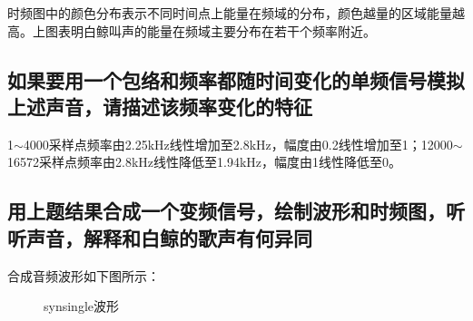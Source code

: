 \documentclass{article}
\begin{document}
            时频图中的颜色分布表示不同时间点上能量在频域的分布，颜色越量的区域能量越高。上图表明白鲸叫声的能量在频域主要分布在若干个频率附近。
            
        \subsection{如果要用一个包络和频率都随时间变化的单频信号模拟上述声音，请描述该频率变化的特征}
            1$\sim$4000采样点频率由2.25kHz线性增加至2.8kHz，幅度由0.2线性增加至1；12000$\sim$16572采样点频率由2.8kHz线性降低至1.94kHz，幅度由1线性降低至0。
            
        \subsection{用上题结果合成一个变频信号，绘制波形和时频图，听听声音，解释和白鲸的歌声有何异同}
            合成音频波形如下图所示：
            \begin{figure}[htb]
                \centering
                \hspace{10pt}
                \caption{synsingle波形}
                \label{fig:synsingle}
            \end{figure}
            
\end{document}
